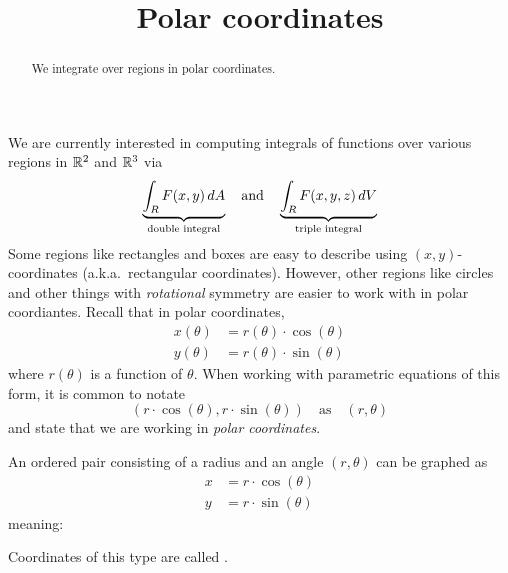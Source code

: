 \documentclass{ximera}
\title[Dig-In:]{Polar coordinates}
\begin{document}
\begin{abstract}
  We integrate over regions in polar coordinates.
\end{abstract}
\maketitle

We are currently interested in computing integrals of functions over
various regions in $\mathbb R^2$ and $\mathbb R^3$ via
\[
\underbrace{\int_R F(x,y) \mathop{}\!d A}_{\text{double integral}} \quad\text{and}\quad \underbrace{\int_R F(x,y,z) \mathop{}\!d V}_{\text{triple integral}}
\]
Some regions like rectangles and boxes are easy to describe using
$(x,y)$-coordinates (a.k.a.\ rectangular coordinates). However, other
regions like circles and other things with \textit{rotational}
symmetry are easier to work with in polar coordiantes. Recall that in
polar coordinates,
\begin{align*} 
  x(\theta) &= r(\theta) \cdot \cos(\theta)\\
  y(\theta) &= r(\theta) \cdot \sin(\theta)
\end{align*}
where $r(\theta)$ is a function of $\theta$.  When working with
parametric equations of this form, it is common to notate
\[
(r \cdot \cos(\theta), r\cdot \sin(\theta)) \quad\text{as}\quad (r,\theta)
\]
and state that we are working in \textit{polar coordinates}.

\begin{definition}
  An ordered pair consisting of a radius and an angle $(r,\theta)$
  can be graphed as
  \begin{align*}
    x &= r\cdot \cos(\theta)\\
    y &= r\cdot \sin(\theta)
  \end{align*}
  meaning:
  \begin{image}[2in]
  \end{image}
  Coordinates of this type are called .
\end{definition}
\end{document}
